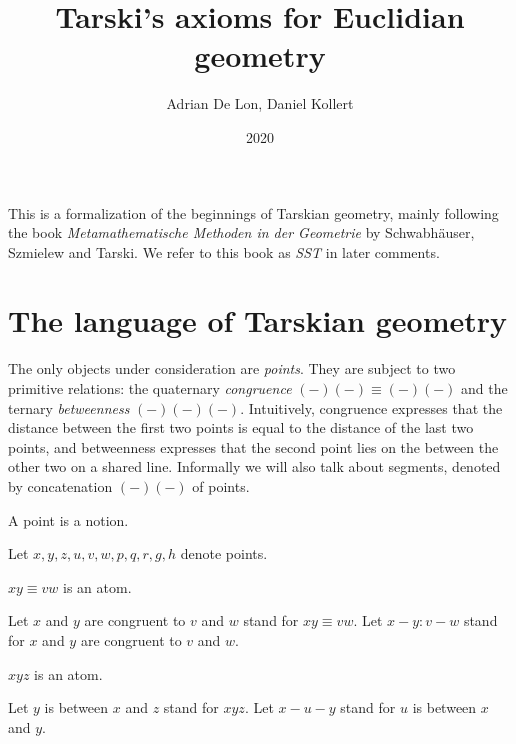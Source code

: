 \documentclass{article}
\title{Tarski's axioms for Euclidian geometry}
\author{Adrian De Lon, Daniel Kollert}
\date{2020}
\newcommand{\Cong}[4]{#1 #2 \equiv #3 #4}
\newcommand{\Betw}[3]{#1 #2 #3}
\begin{document}

  \maketitle

  This is a formalization of the beginnings of Tarskian geometry,
  mainly following the book
  \textit{Metamathematische Methoden in der Geometrie}
  by Schwabhäuser, Szmielew and Tarski.
  We refer to this book as \textit{SST} in later comments.


  \section{The language of Tarskian geometry}

  The only objects under consideration are \textit{points}.
  They are subject to two primitive relations:
  the quaternary \textit{congruence} $\Cong{(-)}{(-)}{(-)}{(-)}$
  and the ternary \textit{betweenness} $\Betw{(-)}{(-)}{(-)}$.
  Intuitively, congruence expresses that the distance between the first two points is equal to the distance of the last two points, and betweenness expresses that
  the second point lies on the between the other two on a shared line.
  Informally we will also talk about segments, denoted by concatenation $(-)(-)$ of points.


  \begin{forthel}

    \begin{signature}
      A point is a notion.
    \end{signature}

    Let $x, y, z, u, v, w, p, q, r, g, h$ denote points.


    \begin{signature}
      $\Cong{x}{y}{v}{w}$ is an atom.
    \end{signature}

    Let $x$ and $y$ are congruent to $v$ and $w$ stand for $\Cong{x}{y}{v}{w}$.
    Let $x-y : v-w$ stand for $x$ and $y$ are congruent to $v$ and $w$.

    \begin{signature}
      $\Betw{x}{y}{z}$ is an atom.
    \end{signature}

    Let $y$ is between $x$ and $z$ stand for $\Betw{x}{y}{z}$.
    Let $x-u-y$ stand for $u$ is between $x$ and $y$.
  \end{forthel}
\end{document}
